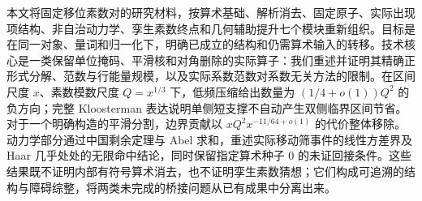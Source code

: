 本文将固定移位素数对的研究材料，按算术基础、解析消去、固定原子、实际出现项结构、非自治动力学、孪生素数终点和几何辅助提升七个模块重新组织。目标是在同一对象、量词和归一化下，明确已成立的结构和仍需算术输入的转移。技术核心是一类保留单位掩码、平滑核和对角删除的实际算子：我们重述并证明其精确正形式分解、范数与行能量规模，以及实际系数范数对系数无关方法的限制。在区间尺度 $x$、素数模数尺度 $Q=x^{1/3}$ 下，低频压缩给出数量为 $(1/4+o(1))Q^2$ 的负方向；完整 Kloosterman 表达说明单侧短支撑不自动产生双侧临界区间节省。对于一个明确构造的平滑分割，边界贡献以 $xQ^2x^{-11/64+o(1)}$ 的代价整体移除。动力学部分通过中国剩余定理与 Abel 求和，重述实际移动筛事件的线性方差界及 Haar 几乎处处的无限命中结论，同时保留指定算术种子 $0$ 的未证回接条件。这些结果既不证明内部有符号算术消去，也不证明孪生素数猜想；它们构成可追溯的结构与障碍综整，将两类未完成的桥接问题从已有成果中分离出来。
